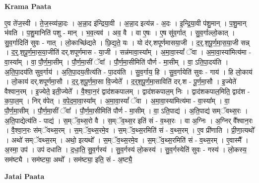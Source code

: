 \documentclass[17pt]{extarticle}
\begin{document}
\textbf{Krama Paata} \newline

ए॒व ते॑ज॒स्वी । ते॒ज॒स्व्य॑न्ना॒दः । अ॒न्ना॒द इ॑न्द्रिया॒वी । अ॒न्ना॒द इत्य॑न्न - अ॒दः । इ॒न्द्रि॒या॒वी प॑शु॒मान् । प॒शु॒मान् भ॑वति । प॒शु॒मानिति॑ पशु - मान् । भ॒व॒त्यव॑ । अव॒ वै । वा ए॒षः । ए॒ष सु॑व॒र्गात् । सु॒व॒र्गाल्लो॒कात् । सु॒व॒र्गादिति॑ सुवः - गात् । लो॒काच्छि॑द्यते । छि॒द्य॒ते॒ यः । यो द॑र्.शपूर्णमासया॒जी । द॒र्॒.श॒पू॒र्ण॒मा॒स॒या॒जी सन्न् । द॒र्॒.श॒पू॒र्ण॒मा॒स॒या॒जीति॑ दर्.शपूर्णमास - या॒जी । सन्न॑मावा॒स्या᳚म् । अ॒मा॒वा॒स्यां᳚ ॅवा । अ॒मा॒वा॒स्या॑मित्य॑मा - वा॒स्या᳚म् । वा॒ पौ॒र्ण॒मा॒सीम् । पौ॒र्ण॒मा॒सीं ॅवा᳚ । पौ॒र्ण॒मा॒सीमिति॑ पौर्ण - मा॒सीम् । वा॒ ऽति॒पा॒दय॑ति । अ॒ति॒पा॒दय॑ति सुव॒र्गाय॑ । अ॒ति॒पा॒दय॒तीत्य॑ति - पा॒दय॑ति । सु॒व॒र्गाय॒ हि । सु॒व॒र्गायेति॑ सुवः - गाय॑ । हि लो॒काय॑ । लो॒काय॑ दर्.शपूर्णमा॒सौ । द॒र्॒.श॒पू॒र्ण॒मा॒सा वि॒ज्येते᳚ । द॒र्॒श॒पू॒र्ण॒मा॒साविति॑ दर्.श - पू॒र्ण॒मा॒सौ । इ॒ज्येते॑ वैश्वान॒रम् । इ॒ज्येते॒ इती॒ज्येते᳚ । वै॒श्वा॒न॒रं द्वाद॑शकपालम् । द्वाद॑शकपाल॒म् निः । द्वाद॑शकपाल॒मिति॒ द्वाद॑श - क॒पा॒ल॒म् । निर् व॑पेत् । व॒पे॒द॒मा॒वा॒स्या᳚म् । अ॒मा॒वा॒स्यां᳚ ॅवा । अ॒मा॒वा॒स्या॑मित्य॑मा - वा॒स्या᳚म् । वा॒ पौ॒र्ण॒मा॒सीम् । पौ॒र्ण॒मा॒सीं ॅवा᳚ । पौ॒र्ण॒मा॒सीमिति॑ पौर्ण - मा॒सीम् । वा॒ ऽति॒पाद्य॑ । अ॒ति॒पाद्य॑ सम्ॅवथ्स॒रः । अ॒ति॒पाद्येत्य॑ति - पाद्य॑ । स॒म्ॅव॒थ्स॒रो वै । स॒म्ॅव॒थ्स॒र इति॑ सं - व॒थ्स॒रः । वा अ॒ग्निः । अ॒ग्निर् वै᳚श्वान॒रः । वै॒श्वा॒न॒रः स॑म्ॅवथ्स॒रम् । स॒म्ॅव॒थ्स॒रमे॒व । स॒म्ॅव॒थ्स॒रमिति॑ सं - व॒थ्स॒रम् । ए॒व प्री॑णाति । प्री॒णा॒त्यथो᳚ । अथो॑ सम्ॅवथ्स॒रम् । अथो॒ इत्यथो᳚ । स॒म्ॅव॒थ्स॒रमे॒व । स॒म्ॅव॒थ्स॒रमिति॑ सं - व॒थ्स॒रम् । ए॒वास्मै᳚ । अ॒स्मा॒ उप॑ । उप॑ दधाति । द॒धा॒ति॒ सु॒व॒र्गस्य॑ । सु॒व॒र्गस्य॑ लो॒कस्य॑ । सु॒व॒र्गस्येति॑ सुवः - गस्य॑ । लो॒कस्य॒ सम॑ष्ट्यै । सम॑ष्ट्या॒ अथो᳚ । सम॑ष्ट्या॒ इति॒ सं - अ॒ष्ट्यै॒ \newline

\textbf{Jatai Paata} \newline
\end{document}
